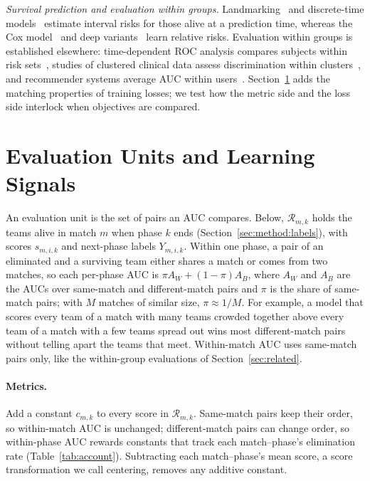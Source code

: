 \documentclass[sigconf,anonymous,nonacm]{acmart}
\begin{document}
\emph{Survival prediction and evaluation within groups.} Landmarking~\cite{vanHouwelingen07} and discrete-time models~\cite{SingerWillett93,Gensheimer19} estimate interval risks for those alive at a prediction time, whereas the Cox model~\cite{Cox72} and deep variants~\cite{DeepHit18,DynamicDeepHit20} learn relative risks. Evaluation within groups is established elsewhere: time-dependent ROC analysis compares subjects within risk sets~\cite{HeagertyZheng05}, studies of clustered clinical data assess discrimination within clusters~\cite{vanKlaveren14}, and recommender systems average AUC within users~\cite{Zhou18}. Section~\ref{sec:account} adds the matching properties of training losses; we test how the metric side and the loss side interlock when objectives are compared.

\section{Evaluation Units and Learning Signals}
\label{sec:account}
An evaluation unit is the set of pairs an AUC compares. Below, $\mathcal{R}_{m,k}$ holds the teams alive in match $m$ when phase $k$ ends (Section~\ref{sec:method:labels}), with scores $s_{m,i,k}$ and next-phase labels $Y_{m,i,k}$. Within one phase, a pair of an eliminated and a surviving team either shares a match or comes from two matches, so each per-phase AUC is $\pi A_W+(1-\pi)A_B$, where $A_W$ and $A_B$ are the AUCs over same-match and different-match pairs and $\pi$ is the share of same-match pairs; with $M$ matches of similar size, $\pi\approx1/M$. For example, a model that scores every team of a match with many teams crowded together above every team of a match with a few teams spread out wins most different-match pairs without telling apart the teams that meet. Within-match AUC uses same-match pairs only, like the within-group evaluations of Section~\ref{sec:related}.

\paragraph{Metrics.}
Add a constant $c_{m,k}$ to every score in $\mathcal{R}_{m,k}$. Same-match pairs keep their order, so within-match AUC is unchanged; different-match pairs can change order, so within-phase AUC rewards constants that track each match--phase's elimination rate (Table~\ref{tab:account}). Subtracting each match--phase's mean score, a score transformation we call centering, removes any additive constant.
\end{document}
